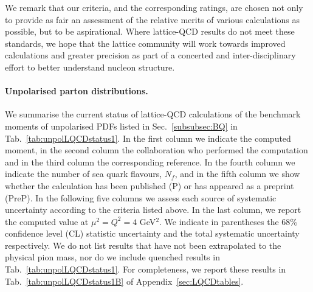 We remark that our criteria, and the corresponding ratings, are chosen 
not only to provide as fair an assessment of the relative merits of various 
calculations as possible, but to be aspirational. 
%
Where lattice-QCD results do not meet these standards, we hope that the lattice 
community will work towards improved calculations and greater precision as 
part of a concerted and inter-disciplinary effort to better understand
nucleon structure.

\paragraph{Unpolarised parton distributions.}
We summarise the current status of lattice-QCD calculations of the benchmark 
moments of unpolarised PDFs listed in Sec.~\ref{subsubsec:BQ} in 
Tab.~\ref{tab:unpolLQCDstatus1}. 
%
In the first column we indicate the computed moment, in the second column
the collaboration who performed the computation and in the third column
the corresponding reference.
%
In the fourth column we indicate the number of sea quark flavours, $N_f$, 
and in the fifth column we show whether the calculation has been published (P) 
or has appeared as a preprint (PreP).
%
In the following five columns we assess each source of systematic uncertainty
according to the criteria listed above. 
%
In the last column, we report the computed value at $\mu^2=Q^2=4$ GeV$^2$.
%
We indicate in parentheses the 68\% confidence level (CL) statistic uncertainty 
and the total systematic uncertainty respectively.
%
We do not list results that have not been extrapolated to the physical pion 
mass, nor do we include quenched results in Tab.~\ref{tab:unpolLQCDstatus1}. 
%
For completeness, we report these results in Tab.~\ref{tab:unpolLQCDstatus1B} 
of Appendix~\ref{sec:LQCDtables}.

